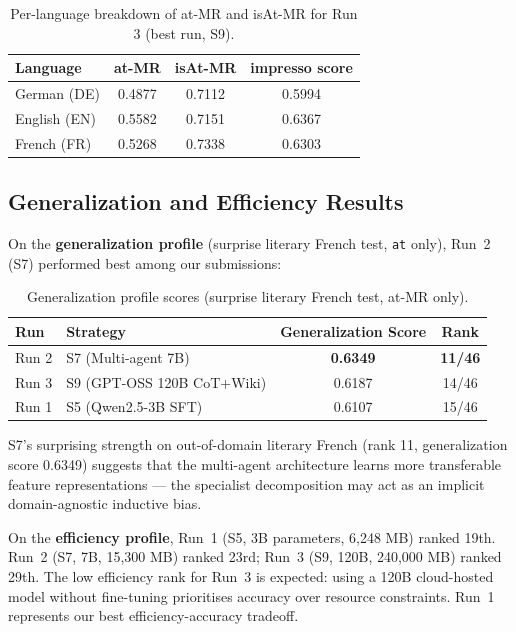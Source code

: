 \documentclass{ceurart}
\begin{document}
\begin{table}[ht]
  \caption{Per-language breakdown of at-MR and isAt-MR for Run 3 (best run, S9).}
  \label{tab:official-lang}
  \centering
  \begin{tabular}{lccc}
    \toprule
    \textbf{Language} & \textbf{at-MR} & \textbf{isAt-MR} & \textbf{impresso score} \\
    \midrule
    German (DE)  & 0.4877 & 0.7112 & 0.5994 \\
    English (EN) & 0.5582 & 0.7151 & 0.6367 \\
    French (FR)  & 0.5268 & 0.7338 & 0.6303 \\
    \bottomrule
  \end{tabular}
\end{table}

\subsection{Generalization and Efficiency Results}

On the \textbf{generalization profile} (surprise literary French test, \texttt{at} only), Run~2 (S7) performed best among our submissions:

\begin{table}[ht]
  \caption{Generalization profile scores (surprise literary French test, at-MR only).}
  \label{tab:gen}
  \centering
  \begin{tabular}{llcc}
    \toprule
    \textbf{Run} & \textbf{Strategy} & \textbf{Generalization Score} & \textbf{Rank} \\
    \midrule
    Run 2 & S7 (Multi-agent 7B) & \textbf{0.6349} & \textbf{11/46} \\
    Run 3 & S9 (GPT-OSS 120B CoT+Wiki) & 0.6187 & 14/46 \\
    Run 1 & S5 (Qwen2.5-3B SFT) & 0.6107 & 15/46 \\
    \bottomrule
  \end{tabular}
\end{table}

S7's surprising strength on out-of-domain literary French (rank 11, generalization score 0.6349) suggests that the multi-agent architecture learns more transferable feature representations --- the specialist decomposition may act as an implicit domain-agnostic inductive bias.

On the \textbf{efficiency profile}, Run~1 (S5, 3B parameters, 6,248 MB) ranked 19th. Run~2 (S7, 7B, 15,300 MB) ranked 23rd; Run~3 (S9, 120B, 240,000 MB) ranked 29th. The low efficiency rank for Run~3 is expected: using a 120B cloud-hosted model without fine-tuning prioritises accuracy over resource constraints. Run~1 represents our best efficiency-accuracy tradeoff.
\end{document}
